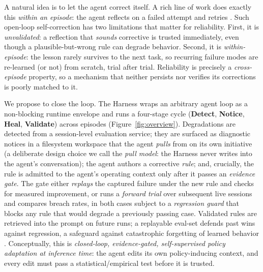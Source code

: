 \documentclass[letterpaper]{article} %
\begin{document}
A natural idea is to let the agent correct itself. A rich line of work does exactly this
\emph{within an episode}: the agent reflects on a failed attempt and retries
\citep{placeholder-reflexion,placeholder-selfrefine,placeholder-critic}. Such open-loop
self-correction has two limitations that matter for reliability. First, it is
\emph{unvalidated}: a reflection that \emph{sounds} corrective is trusted immediately, even
though a plausible-but-wrong rule can degrade behavior. Second, it is \emph{within-episode}:
the lesson rarely survives to the next task, so recurring failure modes are re-learned (or not)
from scratch, trial after trial. Reliability is precisely a \emph{cross-episode} property, so a
mechanism that neither persists nor verifies its corrections is poorly matched to it.

We propose to close the loop. The Harness wraps an arbitrary agent loop as a non-blocking
runtime envelope and runs a four-stage cycle (\textbf{Detect}, \textbf{Notice}, \textbf{Heal},
\textbf{Validate}) across episodes (Figure~\ref{fig:overview}). Degradations are detected from
a session-level evaluation service; they are surfaced as diagnostic notices in a filesystem
workspace that the agent \emph{pulls} from on its own initiative (a deliberate design choice we
call the \emph{pull model}: the Harness never writes into the agent's conversation); the agent
authors a corrective \emph{rule}; and, crucially, the rule is admitted to the agent's
operating context only after it passes an \emph{evidence gate}. The gate either \emph{replays}
the captured failure under the new rule and checks for measured improvement, or runs a
\emph{forward trial} over subsequent live sessions and compares breach rates, in both cases
subject to a \emph{regression guard} that blocks any rule that would degrade a previously
passing case. Validated rules are retrieved into the prompt on future runs; a replayable
eval-set defends past wins against regression, a safeguard against catastrophic forgetting of
learned behavior \citep{placeholder-catforget}. Conceptually, this is \emph{closed-loop,
evidence-gated, self-supervised policy adaptation at inference time}: the agent edits its own
policy-inducing context, and every edit must pass a statistical/empirical test before it is
trusted.
\end{document}
